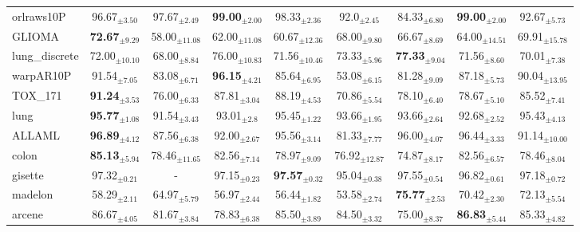 \begin{table}[h]
{\begin{tabular}{lcccccccc}
orlraws10P & 96.67$_{\pm 3.50}$ & 97.67$_{\pm 2.49}$ & \textbf{99.00$_{\pm 2.00}$} & 98.33$_{\pm 2.36}$ & 92.0$_{\pm 2.45}$ & 84.33$_{\pm 6.80}$ & \textbf{99.00$_{\pm 2.00}$} & 92.67$_{\pm 5.73}$ \\
GLIOMA & \textbf{72.67$_{\pm 9.29}$} & 58.00$_{\pm 11.08}$ & 62.00$_{\pm 11.08}$ & 60.67$_{\pm 12.36}$ & 68.00$_{\pm 9.80}$ & 66.67$_{\pm 8.69}$ & 64.00$_{\pm 14.51}$ & 69.91$_{\pm 15.78}$ \\
lung\_discrete & 72.00$_{\pm 10.10}$ & 68.00$_{\pm 8.84}$ & 76.00$_{\pm 10.83}$ & 71.56$_{\pm 10.46}$ & 73.33$_{\pm 5.96}$ & \textbf{77.33$_{\pm 9.04}$} & 71.56$_{\pm 8.60}$ & 70.01$_{\pm 7.38}$ \\
warpAR10P & 91.54$_{\pm 7.05}$ & 83.08$_{\pm 6.71}$ & \textbf{96.15$_{\pm 4.21}$} & 85.64$_{\pm 6.95}$ & 53.08$_{\pm 6.15}$ & 81.28$_{\pm 9.09}$ & 87.18$_{\pm 5.73}$ & 90.04$_{\pm 13.95}$ \\
TOX\_171 & \textbf{91.24$_{\pm 3.53}$} & 76.00$_{\pm 6.33}$ & 87.81$_{\pm 3.04}$ & 88.19$_{\pm 4.53}$ & 70.86$_{\pm 5.54}$ & 78.10$_{\pm 6.40}$ & 78.67$_{\pm 5.10}$ & 85.52$_{\pm 7.41}$ \\
lung & \textbf{95.77$_{\pm 1.08}$} & 91.54$_{\pm 3.43}$ & 93.01$_{\pm 2.8}$ & 95.45$_{\pm 1.22}$ & 93.66$_{\pm 1.95}$ & 93.66$_{\pm 2.64}$ & 92.68$_{\pm 2.52}$ & 95.43$_{\pm 4.13}$ \\
ALLAML & \textbf{96.89$_{\pm 4.12}$} & 87.56$_{\pm 6.38}$ & 92.00$_{\pm 2.67}$ & 95.56$_{\pm 3.14}$ & 81.33$_{\pm 7.77}$ & 96.00$_{\pm 4.07}$ & 96.44$_{\pm 3.33}$ & 91.14$_{\pm 10.00}$ \\
colon & \textbf{85.13$_{\pm 5.94}$} & 78.46$_{\pm 11.65}$ & 82.56$_{\pm 7.14}$ & 78.97$_{\pm 9.09}$ & 76.92$_{\pm 12.87}$ & 74.87$_{\pm 8.17}$ & 82.56$_{\pm 6.57}$ & 78.46$_{\pm 8.04}$ \\
gisette & 97.32$_{\pm 0.21}$ & - & 97.15$_{\pm 0.23}$ & \textbf{97.57$_{\pm 0.32}$} & 95.04$_{\pm 0.38}$ & 97.55$_{\pm 0.54}$ & 96.82$_{\pm 0.61}$ & 97.18$_{\pm 0.72}$ \\
madelon & 58.29$_{\pm 2.11}$ & 64.97$_{\pm 5.79}$ & 56.97$_{\pm 2.44}$ & 56.44$_{\pm 1.82}$ & 53.58$_{\pm 2.74}$ & \textbf{75.77$_{\pm 2.53}$} & 70.42$_{\pm 2.30}$ & 72.13$_{\pm 5.54}$ \\
arcene & 86.67$_{\pm 4.05}$ & 81.67$_{\pm 3.84}$ & 78.83$_{\pm 6.38}$ & 85.50$_{\pm 3.89}$ & 84.50$_{\pm 3.32}$ & 75.00$_{\pm 8.37}$ & \textbf{86.83$_{\pm 5.44}$} & 85.33$_{\pm 4.82}$ \\
\bottomrule
\end{tabular}
}
\end{table}
